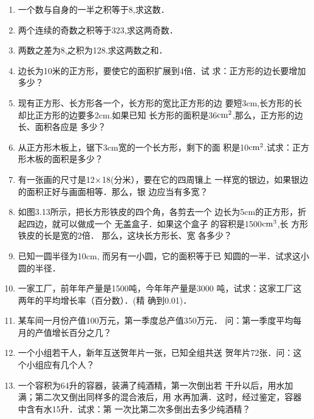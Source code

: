 \begin{enumerate}
\item 一个数与自身的一半之积等于8,求这数．
\item 两个连续的奇数之积等于323,求这两奇数．
\item 两数之差为8,之积为128.求这两数之和．
\item 边长为10米的正方形，要使它的面积扩展到4倍．试
求：正方形的边长要增加多少？
\item 现有正方形、长方形各一个，长方形的宽比正方形的边
要短3cm,长方形的长却比正方形的边要多2cm.如果已知
长方形的面积是36${\rm cm}^2$,那么，正方形的边长、面积各应是
多少？
\item 从正方形木板上，锯下3cm宽的一个长方形，剩下的面
积是10${\rm cm}^2$.试求：正方形木板的面积是多少？
\item 有一张画的尺寸是12$\times$18(分米），要在它的四周镶上
一样宽的银边，如果银边的面积正好与画面相等．那么，银
边应当有多宽？
\item 如图3.13所示，把长方形铁皮的四个角，各剪去一个
边长为5cm的正方形，折
起四边，就可以做成一个
无盖盒子．如果这个盒子
的容积是1500${\rm cm}^3$,长
方形铁皮的长是宽的2倍．
那么，这块长方形长、宽
各多少？
\begin{figure}[htp]
    \centering
{}
    \caption{}
\end{figure}

\item 已知一圆半径为10cm, 而另有一小圆，它的面积等于已
知圆的一半．试求这小圆的半径．
\item 一家工厂，前年年产量是1500吨，今年年产量是3000
吨，试求：这家工厂这两年的平均增长率（百分数）．(精
确到0.01)．
\item 某车间一月份产值100万元，第一季度总产值350万元．
问：第一季度平均每月的产值增长百分之几？
\item 一个小组若干人，新年互送贺年片一张，已知全组共送
贺年片72张．问：这个小组应有几个人？
\item 一个容积为64升的容器，装满了纯酒精，第一次倒出若
干升以后，用水加满；第二次又倒出同样多的混合液后，用
水再加满．这时，经过鉴定，容器中含有水15升．试求：第
一次比第二次多倒出去多少纯酒精？
\end{enumerate}

